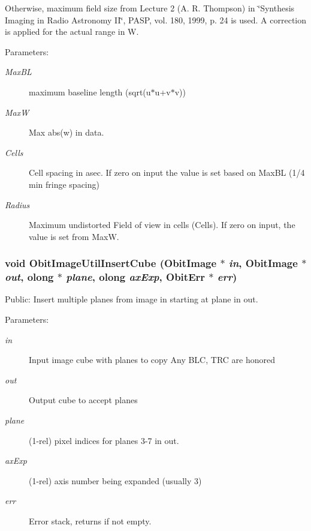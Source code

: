 Otherwise, maximum field size from Lecture 2 (A. R. Thompson) in \char`\"{}Synthesis Imaging in Radio Astronomy II\char`\"{}, PASP, vol. 180, 1999, p. 24 is used. A correction is applied for the actual range in W. \begin{Desc}
\item[Parameters:]
\begin{description}
\item[{\em Max\-BL}]maximum baseline length (sqrt(u$\ast$u+v$\ast$v)) \item[{\em Max\-W}]Max abs(w) in data. \item[{\em Cells}]Cell spacing in asec. If zero on input the value is set based on Max\-BL (1/4 min fringe spacing) \item[{\em Radius}]Maximum undistorted Field of view in cells (Cells). If zero on input, the value is set from Max\-W. \end{description}
\end{Desc}
\subsubsection{\setlength{\rightskip}{0pt plus 5cm}void Obit\-Image\-Util\-Insert\-Cube ({\bf Obit\-Image} $\ast$ {\em in}, {\bf Obit\-Image} $\ast$ {\em out}, {\bf olong} $\ast$ {\em plane}, {\bf olong} {\em ax\-Exp}, {\bf Obit\-Err} $\ast$ {\em err})}\label{ObitImageUtil_8c_a20}


Public: Insert multiple planes from image in starting at plane in out. 

\begin{Desc}
\item[Parameters:]
\begin{description}
\item[{\em in}]Input image cube with planes to copy Any BLC, TRC are honored \item[{\em out}]Output cube to accept planes \item[{\em plane}](1-rel) pixel indices for planes 3-7 in out. \item[{\em ax\-Exp}](1-rel) axis number being expanded (usually 3) \item[{\em err}]Error stack, returns if not empty. \end{description}
\end{Desc}
